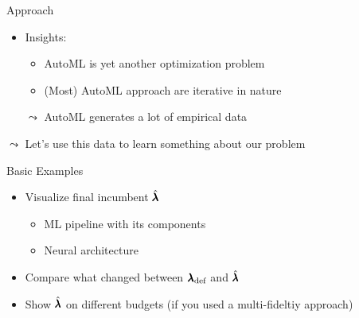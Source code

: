 \begin{frame}[c]{Approach}


\begin{itemize}
	\item \alert{Insights:}
	\begin{itemize}
		\item AutoML is yet another optimization problem
		\item (Most) AutoML approach are iterative in nature 
    \end{itemize}
	\item[$\leadsto$] AutoML generates a lot of empirical data 
\end{itemize}

\begin{center}
\scalebox{0.9}{
	
}
\end{center}

{$\leadsto$ Let's use this data to learn something about our problem}

\end{frame}
\begin{frame}[c]{Basic Examples}

\begin{itemize}
	\item Visualize final incumbent $\hat{\pmb{\lambda}}$
	\begin{itemize}
		\item ML pipeline with its components
		\item Neural architecture
	\end{itemize}
	\medskip
	\pause
	\item Compare what changed between ${\pmb{\lambda}}_{\text{def}}$ and $\hat{\pmb{\lambda}}$
	\medskip
	\pause		
	\item Show $\hat{\pmb{\lambda}}$ on different budgets (if you used a multi-fideltiy approach)
\end{itemize}

\end{frame}
